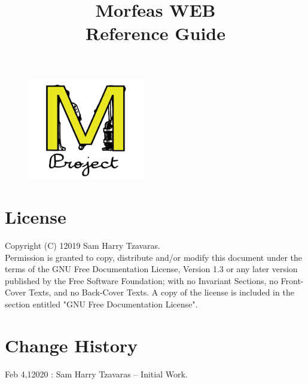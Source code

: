 \documentclass{article}
\title{Morfeas WEB\\Reference Guide}
\author{}
\date{}
\begin{document}
\clearpage
\begin{figure}
\centering
  \includegraphics[width=2in]{../../Morfeas_WEB/art/Morfeas_logo_yellow.png}
\end{figure}
\maketitle
\thispagestyle{empty}
\newpage
\section{License}
Copyright (C)  12019  Sam Harry Tzavaras.\\
Permission is granted to copy, distribute and/or modify this document
under the terms of the GNU Free Documentation License, Version 1.3
or any later version published by the Free Software Foundation;
with no Invariant Sections, no Front-Cover Texts, and no Back-Cover Texts.
A copy of the license is included in the section entitled "GNU Free Documentation License".

\section{Change History}
Feb 4,12020 : Sam Harry Tzavaras -- Initial Work.

\newpage
\tableofcontents
\newpage



\newpage

\end{document}
